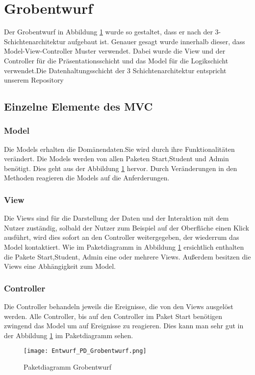\documentclass[a4paper,10pt]{article}
\begin{document}
\section{Grobentwurf}
Der Grobentwurf in Abbildung \ref{fig:Paketdiagramm_Grobentwurf} wurde so gestaltet, dass er nach der 3-Schichtenarchitektur aufgebaut ist. Genauer gesagt wurde innerhalb dieser, dass Model-View-Controller Muster verwendet. 
Dabei wurde die View und der Controller für die Präsentationsschicht und das Model für die Logikschicht verwendet.Die Datenhaltungsschicht der 3 Schichtenarchitektur entspricht unserem Repository

\subsection{Einzelne Elemente des MVC}
  \subsubsection{Model} 
    Die Models erhalten die Domänendaten.Sie wird durch ihre Funktionalitäten verändert. Die Models werden von allen Paketen Start,Student und Admin ben\"otigt. Dies geht aus der Abbildung \ref{fig:Paketdiagramm_Grobentwurf} hervor.
    Durch Ver\"anderungen in den Methoden reagieren die Models auf die Anferderungen.
   \subsubsection{View}
   Die Views sind für die Darstellung der Daten und der Interaktion mit dem Nutzer zuständig, solbald der Nutzer zum Beispiel auf der Oberfläche einen Klick ausführt, wird dies sofort an den Controller weitergegeben, der wiederrum das Model kontaktiert.
   Wie im Paketdiagramm in  Abbildung \ref{fig:Paketdiagramm_Grobentwurf} ersichtlich enthalten die Pakete Start,Student, Admin eine oder mehrere Views.
   Au\ss{}erdem besitzen die Views eine Abh\"angigkeit zum Model.
   \subsubsection{Controller}
   Die Controller behandeln jeweils die Ereignisse, die von den Views ausgelöst werden. Alle Controller, bis auf den Controller im Paket Start ben\"otigen zwingend das Model um auf Ereignisse zu reagieren. Dies kann man sehr gut in der Abbildung \ref{fig:Paketdiagramm_Grobentwurf} im Paketdiagramm sehen.
   
   \begin{figure}
    \texttt{[image: Entwurf\_PD\_Grobentwurf.png]}
    \label{fig:Paketdiagramm_Grobentwurf}
    \caption{Paketdiagramm Grobentwurf}
   \end{figure} 
\end{document}
